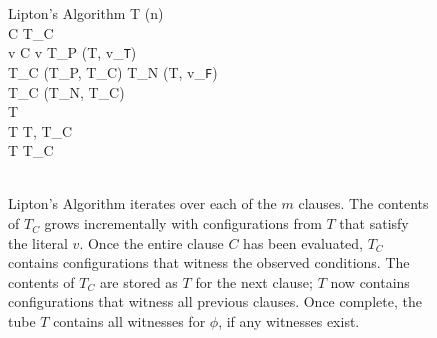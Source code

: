 
\begin{figure}[htbp]
	\renewcommand{\figurename}{Algorithm}
	\renewcommand{\thepseudocode}{\ref{liptonAlgorithm}}
	
	\begin{center}

	\begin{pseudocode}[shadowbox]{Lipton's Algorithm}{\phi}
	T \GETS {}(n) \\
	\FOREACH {} C  \phi \DO
		\BEGIN
		T_C \GETS \emptyset \\
		\FOREACH {} v  C \DO
			\BEGIN
				\IF v  \THEN
					\BEGIN
						T_P \GETS {}(T, v_{\texttt{T}})\\
						T_C \GETS {}(T_P, T_C)						
					\END
				\ELSE
					\BEGIN
						T_N \GETS {}(T, v_{\texttt{F}})\\
						T_C \GETS {}(T_N, T_C)						
					\END
			\END
		\\
		T \GETS \emptyset \\
		T \GETS {}T, T_C\text{)} \\
		T \GETS {}T_C\text{)} \\
		\END
	\\
	\end{pseudocode}

\caption{{\sc Lipton's Algorithm} iterates over each of the $m$ clauses.  The contents of $T_C$ grows incrementally with configurations from $T$ that satisfy the literal $v$.  Once the entire clause $C$ has been evaluated, $T_C$ contains configurations that witness the observed conditions.  The contents of $T_C$ are stored as $T$ for the next clause; $T$ now contains configurations that witness all previous clauses.  Once complete, the tube $T$ contains all witnesses for $\phi$, if any witnesses exist.}
\label{liptonAlgorithm}
\end{center}
\end{figure}

